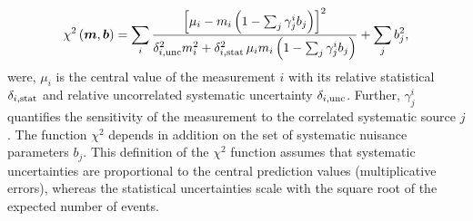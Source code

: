 \begin{description}
{ \small
\begin{equation} 
    \chi^2\left(\boldsymbol{m},\boldsymbol{b}\right) =   
 \sum_i \frac{\left[ {\mu_i} - m_i \left( 1 - \sum_j \gamma^i_j b_j \right) \right]^2}
{ \textstyle \delta^2_{i,{\rm unc}}m_i^2 + \delta^2_{i,{\rm stat}}\, {\mu_i} m_i \left(1 - \sum_j \gamma^i_j b_j\right) }
  + \sum_j b^2_j,
\label{eq:aven}
\end{equation}}
%
were, ${\mu_i}$ is the central value of the measurement $i$ 
with its relative statistical $\delta_{i,\rm stat}$ 
and relative uncorrelated systematic uncertainty $\delta_{i,\rm unc}$.
Further, $\gamma^i_j$ quantifies the sensitivity of the
measurement to the correlated systematic source $j$. 
The function $\chi^2$ depends in addition on
 the set of systematic nuisance parameters $b_j$.
This definition of the $\chi^2$ function assumes that
systematic uncertainties are proportional to the central prediction values
(multiplicative errors), whereas the statistical uncertainties scale 
with the square root of the expected number of events. 


\end{description}
